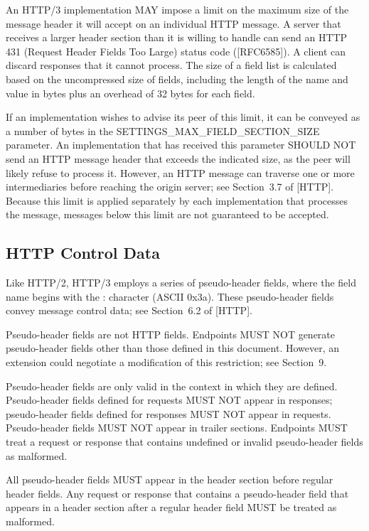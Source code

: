 \documentclass{article}
\begin{document}
An HTTP/3 implementation MAY impose a limit on the maximum size of the message header it will accept on an individual HTTP message.  A server that receives a larger header section than it is willing to handle can send an HTTP 431 (Request Header Fields Too Large) status code ([RFC6585]).  A client can discard responses that it cannot process.  The size of a field list is calculated based on the uncompressed size of fields, including the length of the name and value in bytes plus an overhead of 32 bytes for each field.

If an implementation wishes to advise its peer of this limit, it can be conveyed as a number of bytes in the SETTINGS\_MAX\_FIELD\_SECTION\_SIZE parameter.  An implementation that has received this parameter SHOULD NOT send an HTTP message header that exceeds the indicated size, as the peer will likely refuse to process it.  However, an HTTP message can traverse one or more intermediaries before reaching the origin server; see Section~3.7 of [HTTP].  Because this limit is applied separately by each implementation that processes the message, messages below this limit are not guaranteed to be accepted.

\subsection{HTTP Control Data}

Like HTTP/2, HTTP/3 employs a series of pseudo-header fields, where the field name begins with the : character (ASCII 0x3a).  These pseudo-header fields convey message control data; see Section~6.2 of [HTTP].

Pseudo-header fields are not HTTP fields.  Endpoints MUST NOT generate pseudo-header fields other than those defined in this document.  However, an extension could negotiate a modification of this restriction; see Section~9.

Pseudo-header fields are only valid in the context in which they are defined.  Pseudo-header fields defined for requests MUST NOT appear in responses; pseudo-header fields defined for responses MUST NOT appear in requests.  Pseudo-header fields MUST NOT appear in trailer sections.  Endpoints MUST treat a request or response that contains undefined or invalid pseudo-header fields as malformed.

All pseudo-header fields MUST appear in the header section before regular header fields.  Any request or response that contains a pseudo-header field that appears in a header section after a regular header field MUST be treated as malformed.
\end{document}
